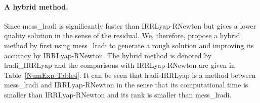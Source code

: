 \documentclass[11pt]{article}
\numberwithin{equation}{section}
\begin{document}


\paragraph{A hybrid method.} Since mess\_lradi is significantly faster than IRRLyap-RNewton but gives a lower quality solution in the sense of the residual. We, therefore, propose a hybrid method by first using mess\_lradi to generate a rough solution and improving its accuracy by IRRLyap-RNewton. The hybrid method is denoted by lradi\_IRRLyap and the comparisons with IRRLyap-RNewton are given in Table~\ref{NumExp-Table4}. It can be seen that lradi-IRRLyap is a method between mess\_lradi and IRRLyap-RNewton in the sense that its computational time is smaller than IRRLyap-RNewton and its rank is smaller than mess\_lradi.

\end{document}
